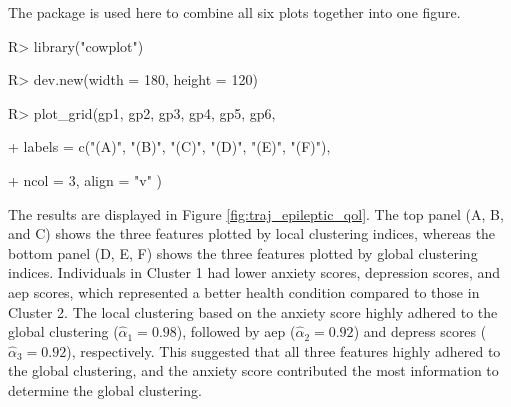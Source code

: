 The  package \citep{Wilke2019} is used here to combine all six plots together into one figure. 

\begin{example}

R> library("cowplot")

R> dev.new(width = 180, height = 120)

R> plot_grid(gp1, gp2, gp3, gp4, gp5, gp6, 

+        labels = c("(A)", "(B)", "(C)", "(D)", "(E)", "(F)"), 

+        ncol = 3, align = "v" )  

\end{example}

The results are displayed in Figure \ref{fig:traj_epileptic_qol}. The top panel (A, B, and C) shows the three features plotted by local clustering indices, whereas the bottom panel (D, E, F) shows the three features plotted by global clustering indices. Individuals in Cluster 1 had lower anxiety scores, depression scores, and aep scores, which represented a better health condition compared to those in Cluster 2. The local clustering based on the anxiety score highly adhered to the global clustering ($\hat{\alpha}_1 = 0.98$), followed by aep ($\hat{\alpha}_2 = 0.92$) and depress scores ($\hat{\alpha}_3 = 0.92$), respectively. This suggested that all three features highly adhered to the global clustering, and the anxiety score contributed the most information to determine the global clustering. 

